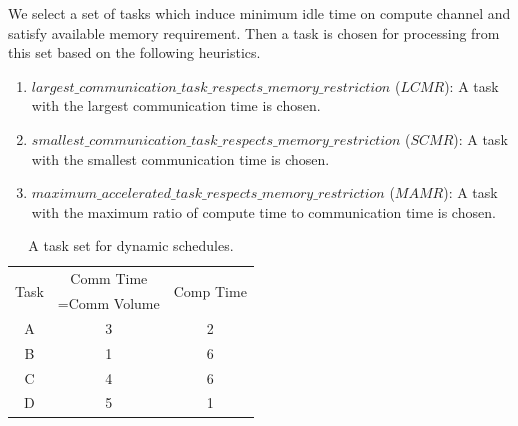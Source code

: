 \documentclass[sigconf]{acmart}
\begin{document}
	We select a set of tasks which induce minimum idle time on compute channel and satisfy available memory requirement. Then a task is chosen for processing from this set based on the following heuristics.
	\begin{enumerate}[label=\roman*)]
		
		\item $largest\_communication\_task\_respects\_memory\_restriction$ ($LCMR$):    A task with the largest communication time is chosen. 
		\item $smallest\_communication\_task\_respects\_memory\_restriction$ ($SCMR$): A task with the smallest communication time is chosen.
		\item $maximum\_accelerated\_task\_respects\_memory\_restriction$ ($MAMR$):  A task with the maximum ratio of compute time to communication time  is chosen.
	\end{enumerate}
	\begin{table}[htb]
		\begin{center}
			
			\begin{tabular}{|c|c|c|}
				\hline
				\multirow{2}{*}{Task} & Comm Time & \multirow{2}{*}{Comp Time}\\ 
				&=Comm Volume& \\ \hline
				A & 3 & 2\\ \hline
				B & 1 & 6\\ \hline
				C & 4 & 6\\ \hline
				D & 5 & 1\\ \hline
			\end{tabular}
			\caption{\label{tab:dynamicSelectionExample} A task set for dynamic schedules.}
		\end{center}
	\end{table}
	
\end{document}
